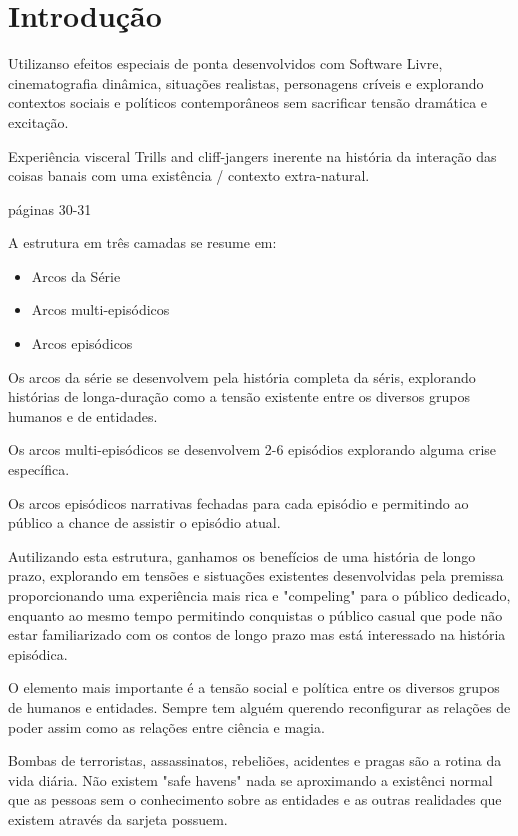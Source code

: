 \chapter*[Introdução]{Introdução}

Utilizanso efeitos especiais de ponta desenvolvidos com Software Livre, cinematografia dinâmica, situações realistas, personagens críveis e explorando  contextos sociais e políticos contemporâneos sem sacrificar tensão dramática e excitação.

Experiência visceral
Trills and cliff-jangers inerente na história da interação das coisas banais com uma existência / contexto extra-natural.

páginas 30-31

A estrutura em três camadas se resume em:

\begin{itemize}
\item Arcos da Série
\item Arcos multi-episódicos
\item Arcos episódicos
\end{itemize}

Os arcos da série se desenvolvem pela história completa da séris, explorando histórias de longa-duração como a tensão existente entre os diversos grupos humanos e de entidades.

Os arcos multi-episódicos se desenvolvem 2-6 episódios explorando alguma crise específica.

Os arcos episódicos narrativas fechadas para cada episódio e permitindo ao público a chance de assistir o episódio atual.

Autilizando esta estrutura, ganhamos os benefícios de uma história de longo prazo, explorando em tensões e sistuações existentes desenvolvidas pela premissa proporcionando uma experiência mais rica e "compeling" para o público dedicado, enquanto ao mesmo tempo permitindo conquistas o público casual que pode não estar familiarizado com os contos de longo prazo mas está interessado na história episódica.

O elemento mais importante é a tensão social e política entre os diversos grupos de humanos e entidades. Sempre tem alguém querendo reconfigurar as relações de poder assim como as relações entre ciência e magia.

Bombas de terroristas, assassinatos, rebeliões, acidentes e pragas são a rotina da vida diária. Não existem "safe havens" nada se aproximando a existênci normal que as pessoas sem o conhecimento sobre as entidades e as outras realidades que existem através da sarjeta possuem.





